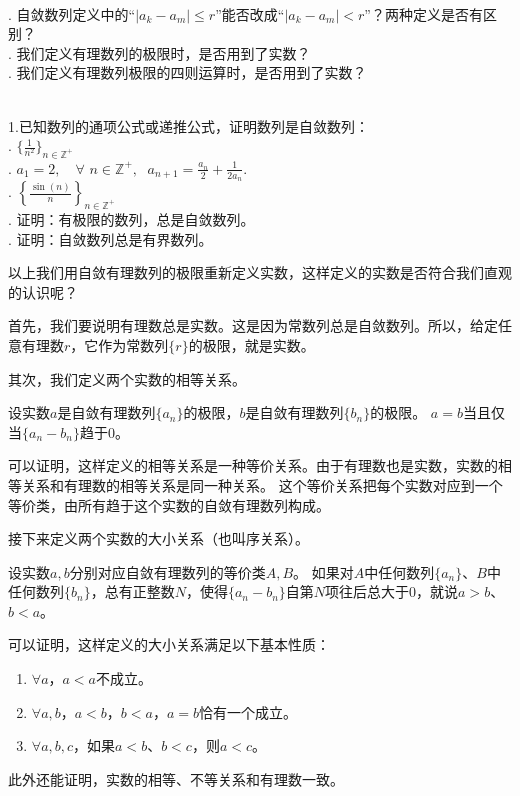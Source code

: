 \documentclass[12pt,UTF8,fontset=none]{ctexbook}
\begin{document}
\begin{sk}
    \mbox{}\\
    . 自敛数列定义中的“$|a_k -a_m| \leqslant r$”能否改成“$|a_k -a_m| < r$”？两种定义是否有区别？\\
    . 我们定义有理数列的极限时，是否用到了实数？\\
    . 我们定义有理数列极限的四则运算时，是否用到了实数？
\end{sk}
\begin{xt}
    \mbox{}\\
    \indent 1.已知数列的通项公式或递推公式，证明数列是自敛数列：\\
    . $\{\frac{1}{n^2}\}_{n\in\mathbb{Z}^+}$\\
    . $a_1 = 2, \quad \forall \,\, n\in\mathbb{Z}^+, \;\,\, a_{n+1} = \frac{a_n}{2} + \frac{1}{2a_n}.$\\
    . $\left\{\frac{\sin(n)}{n}\right\}_{n\in\mathbb{Z}^+}$ \\
    . 证明：有极限的数列，总是自敛数列。\\
    . 证明：自敛数列总是有界数列。
\end{xt}

以上我们用自敛有理数列的极限重新定义实数，这样定义的实数是否符合我们直观的认识呢？

首先，我们要说明有理数总是实数。这是因为常数列总是自敛数列。所以，给定任意有理数$r$，它作为常数列$\{r\}$的极限，就是实数。

其次，我们定义两个实数的相等关系。
\begin{df}
    设实数$a$是自敛有理数列$\{a_n\}$的极限，$b$是自敛有理数列$\{b_n\}$的极限。
    $a = b$当且仅当$\{a_n - b_n\}$趋于$0$。
\end{df}
可以证明，这样定义的相等关系是一种等价关系。由于有理数也是实数，实数的相等关系和有理数的相等关系是同一种关系。
这个等价关系把每个实数对应到一个等价类，由所有趋于这个实数的自敛有理数列构成。

接下来定义两个实数的大小关系（也叫序关系）。
\begin{df}
    设实数$a,b$分别对应自敛有理数列的等价类$A,B$。
    如果对$A$中任何数列$\{a_n\}$、$B$中任何数列$\{b_n\}$，总有正整数$N$，使得$\{a_n - b_n\}$自第$N$项往后总大于$0$，就说$a>b$、$b<a$。
\end{df}
可以证明，这样定义的大小关系满足以下基本性质：
\begin{enumerate}
    \item $\forall a$，$a < a$不成立。
    \item $\forall a, b$，$a < b$，$b <a$，$a = b$恰有一个成立。
    \item $\forall a, b, c$，如果$a < b$、$b < c$，则$a < c$。
\end{enumerate}
此外还能证明，实数的相等、不等关系和有理数一致。
\end{document}
